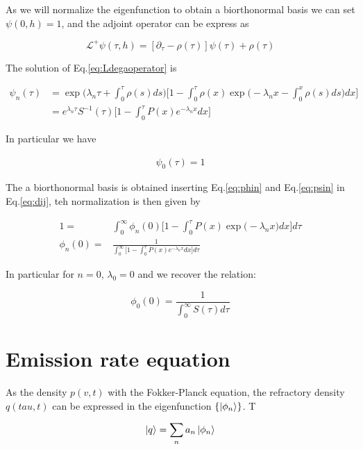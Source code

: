 \documentclass[12pt,twoside]{report}
\begin{document}
As we will normalize the eigenfunction to obtain a biorthonormal basis we can set $\psi(0,h)=1$, and the adjoint operator can be express as

\begin{equation}
\label{eq:Ldega}
\mathcal{L}^+\psi(\tau,h)=[\partial_{\tau}-\rho(\tau)]\psi(\tau)+\rho(\tau)
\end{equation}

The solution of Eq.\eqref{eq:Ldegaoperator} is

\begin{align}
\label{eq:psin}
\psi_n(\tau)&=\exp\big(\lambda_n\tau+\int_0^\tau\rho(s)ds\big)\nonumber\big[1-\int^\tau_0 \rho(x) \exp\big(-\lambda_nx-\int_0^x\rho(s)ds\big)dx\big]\\
&=e^{\lambda_n\tau}S^{-1}(\tau)\big[1-\int^\tau_0 P(x) e^{-\lambda_nx}dx\big]
\end{align}

In particular we have

\begin{align}
\label{eq:psi0}
\psi_0(\tau)=1
\end{align}



The a biorthonormal basis is obtained inserting Eq.\eqref{eq:phin} and Eq.\eqref{eq:psin} in Eq.\eqref{eq:dij}, teh normalization is then given by 

\begin{align}
1=&\int_0^{\infty}\phi_n(0)\big[1-\int^\tau_0 P(x) \exp\big(-\lambda_nx)dx\big]d\tau \\
\phi_n(0) =&\frac{1}{\int_0^{\infty}\big[1-\int^\tau_0 P(x) e^{-\lambda_nx}dx\big]d\tau}
\end{align}


In particular for $n=0$, $\lambda_0=0$ and we recover the relation:

\begin{equation}
\phi_0(0) = \frac{1}{\int_0^{\infty}S(\tau)d\tau}
\end{equation}

\section{Emission rate equation}

As the density $p(v,t)$ with the Fokker-Planck equation, the refractory density $q(tau,t)$ can be expressed in the eigenfunction  $ \{\ket{\phi_n}\}$. T

\begin{equation}
\label{eq:q}
\ket{q}=\sum_na_n\ket{\phi_n}
\end{equation}
\end{document}
